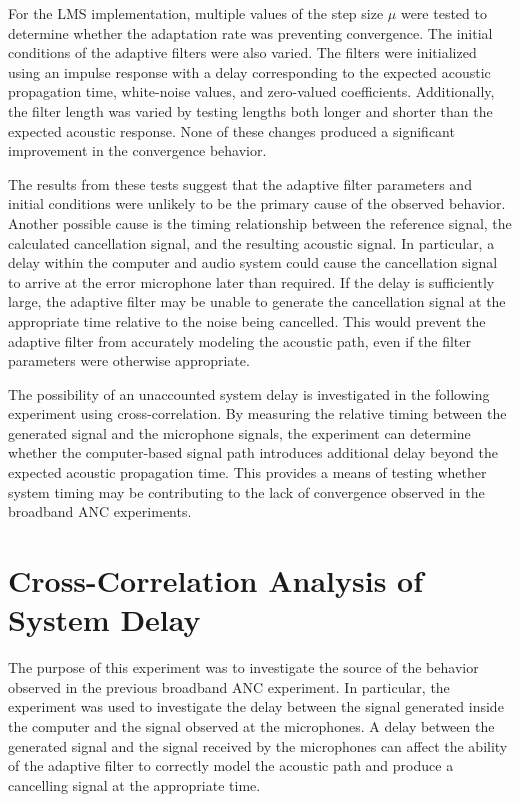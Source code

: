 For the LMS implementation, multiple values of the step size $\mu$ were tested to determine whether the adaptation rate was preventing convergence. The initial conditions of the adaptive filters were also varied. The filters were initialized using an impulse response with a delay corresponding to the expected acoustic propagation time, white-noise values, and zero-valued coefficients. Additionally, the filter length was varied by testing lengths both longer and shorter than the expected acoustic response. None of these changes produced a significant improvement in the convergence behavior.

The results from these tests suggest that the adaptive filter parameters and initial conditions were unlikely to be the primary cause of the observed behavior. Another possible cause is the timing relationship between the reference signal, the calculated cancellation signal, and the resulting acoustic signal. In particular, a delay within the computer and audio system could cause the cancellation signal to arrive at the error microphone later than required. If the delay is sufficiently large, the adaptive filter may be unable to generate the cancellation signal at the appropriate time relative to the noise being cancelled. This would prevent the adaptive filter from accurately modeling the acoustic path, even if the filter parameters were otherwise appropriate.

The possibility of an unaccounted system delay is investigated in the following experiment using cross-correlation. By measuring the relative timing between the generated signal and the microphone signals, the experiment can determine whether the computer-based signal path introduces additional delay beyond the expected acoustic propagation time. This provides a means of testing whether system timing may be contributing to the lack of convergence observed in the broadband ANC experiments.

\section{Cross-Correlation Analysis of System Delay}

The purpose of this experiment was to investigate the source of the behavior observed in the previous broadband ANC experiment. In particular, the experiment was used to investigate the delay between the signal generated inside the computer and the signal observed at the microphones. A delay between the generated signal and the signal received by the microphones can affect the ability of the adaptive filter to correctly model the acoustic path and produce a cancelling signal at the appropriate time.

